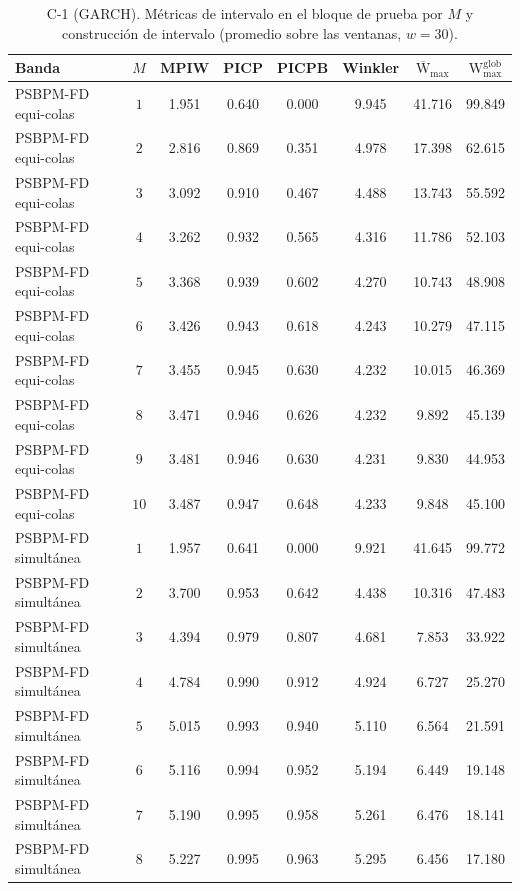 \begin{table}[H]
\centering\footnotesize
\caption{C-1 (GARCH). Métricas de intervalo en el bloque de prueba por $M$ y construcción de intervalo (promedio sobre las ventanas, $w = 30$).}
\label{tab:aneB_B_C1}
\begin{tabular}{l c cccccc}
\hline
 Banda & $M$ & MPIW & PICP & PICPB & Winkler & $\overline{\mathrm{W}}_{\max}$ & $\mathrm{W}_{\max}^{\mathrm{glob}}$ \\
\hline
PSBPM-FD equi-colas & $1$ & 1.951 & 0.640 & 0.000 & 9.945 & 41.716 & 99.849 \\
PSBPM-FD equi-colas & $2$ & 2.816 & 0.869 & 0.351 & 4.978 & 17.398 & 62.615 \\
PSBPM-FD equi-colas & $3$ & 3.092 & 0.910 & 0.467 & 4.488 & 13.743 & 55.592 \\
PSBPM-FD equi-colas & $4$ & 3.262 & 0.932 & 0.565 & 4.316 & 11.786 & 52.103 \\
PSBPM-FD equi-colas & $5$ & 3.368 & 0.939 & 0.602 & 4.270 & 10.743 & 48.908 \\
PSBPM-FD equi-colas & $6$ & 3.426 & 0.943 & 0.618 & 4.243 & 10.279 & 47.115 \\
PSBPM-FD equi-colas & $7$ & 3.455 & 0.945 & 0.630 & 4.232 & 10.015 & 46.369 \\
PSBPM-FD equi-colas & $8$ & 3.471 & 0.946 & 0.626 & 4.232 & 9.892 & 45.139 \\
PSBPM-FD equi-colas & $9$ & 3.481 & 0.946 & 0.630 & 4.231 & 9.830 & 44.953 \\
PSBPM-FD equi-colas & $10$ & 3.487 & 0.947 & 0.648 & 4.233 & 9.848 & 45.100 \\
\hline
PSBPM-FD simultánea & $1$ & 1.957 & 0.641 & 0.000 & 9.921 & 41.645 & 99.772 \\
PSBPM-FD simultánea & $2$ & 3.700 & 0.953 & 0.642 & 4.438 & 10.316 & 47.483 \\
PSBPM-FD simultánea & $3$ & 4.394 & 0.979 & 0.807 & 4.681 & 7.853 & 33.922 \\
PSBPM-FD simultánea & $4$ & 4.784 & 0.990 & 0.912 & 4.924 & 6.727 & 25.270 \\
PSBPM-FD simultánea & $5$ & 5.015 & 0.993 & 0.940 & 5.110 & 6.564 & 21.591 \\
PSBPM-FD simultánea & $6$ & 5.116 & 0.994 & 0.952 & 5.194 & 6.449 & 19.148 \\
PSBPM-FD simultánea & $7$ & 5.190 & 0.995 & 0.958 & 5.261 & 6.476 & 18.141 \\
PSBPM-FD simultánea & $8$ & 5.227 & 0.995 & 0.963 & 5.295 & 6.456 & 17.180 \\

\end{tabular}
\end{table}
